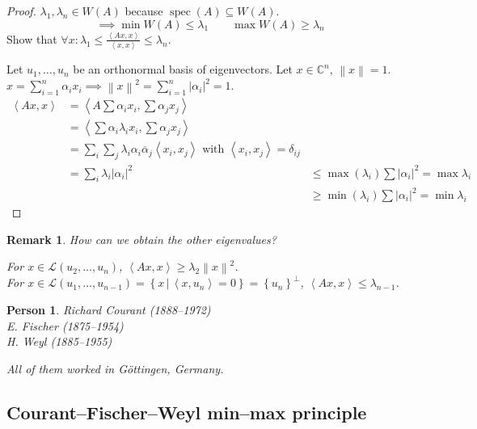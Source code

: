 \documentclass[a4paper]{article}
\newcounter{lecref}[section]
\numberwithin{lecref}{section}
\newtheorem{remark}[lecref]{Remark}
\newtheorem*{Person}{Person}
\newcommand{\set}[1]{\left\{#1\right\}}
\newcommand{\setdef}[2]{\left\{\left.#1\,\right|\,#2\right\}}
\newcommand{\angel}[1]{\left\langle#1\right\rangle}
\newcommand{\norm}[1]{\left\|#1\right\|}
\newcommand{\card}[1]{\left|#1\right|}
\begin{document}
\begin{proof}
  $\lambda_1, \lambda_n \in W(A)$ because $\operatorname{spec}(A) \subseteq W(A)$.
  \[ \implies \min{W(A)} \leq \lambda_1 \qquad \max{W(A)} \geq \lambda_n \]
  Show that $\forall x: \lambda_1 \leq \frac{\angel{Ax, x}}{\angel{x, x}} \leq \lambda_n$.

  Let $u_1, \dots, u_n$ be an orthonormal basis of eigenvectors.
  Let $x \in \mathbb C^n$, $\norm{x} = 1$. $x = \sum_{i=1}^n \alpha_i x_i \implies \norm{x}^2 = \sum_{i=1}^n \card{\alpha_i}^2 = 1$.
  \begin{align*}
    \angel{Ax, x} &= \angel{A \sum \alpha_i x_i, \sum \alpha_j x_j} \\
      &= \angel{\sum \alpha_i \lambda_i x_i, \sum \alpha_j x_j} \\
      &= \sum_{i} \sum_{j} \lambda_i \alpha_i \overline{\alpha}_j \angel{x_i, x_j} \text { with } \angel{x_i, x_j} = \delta_{ij} \\
      &= \sum_{i} \lambda_i \card{\alpha_i}^2  & \leq \max(\lambda_i) \sum \card{\alpha_i}^2 = \max{\lambda_i} \\
      &                                        &\geq \min(\lambda_i) \sum \card{\alpha_i}^2 = \min{\lambda_i}
  \end{align*}
\end{proof}

\begin{remark} %
  How can we obtain the other eigenvalues?

  For $x \in \mathcal L(u_2, \dots, u_n)$, $\angel{Ax, x} \geq \lambda_2 \norm{x}^2$. \\
  For $x \in \mathcal L(u_1, \dots, u_{n-1}) = \setdef{x}{\angel{x, u_n} = 0} = \set{u_n}^\bot$, $\angel{Ax, x} \leq \lambda_{n-1}$.
\end{remark}

\begin{Person}
  Richard Courant (1888--1972) \\
  E. Fischer (1875--1954) \\
  H. Weyl (1885--1955)

  All of them worked in Göttingen, Germany.
\end{Person}

\subsection{Courant--Fischer--Weyl min--max principle}
\end{document}
